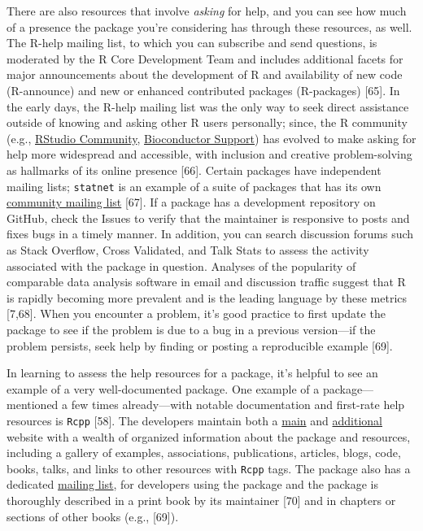 \documentclass[10pt,letterpaper]{article}
\begin{document}
There are also resources that involve \emph{asking} for help, and you
can see how much of a presence the package you're considering has
through these resources, as well. The R-help mailing list, to which you
can subscribe and send questions, is moderated by the R Core Development
Team and includes additional facets for major announcements about the
development of R and availability of new code (R-announce) and new or
enhanced contributed packages (R-packages) {[}65{]}. In the early days,
the R-help mailing list was the only way to seek direct assistance
outside of knowing and asking other R users personally; since, the R
community (e.g., \href{https://community.rstudio.com/}{RStudio
Community}, \href{https://support.bioconductor.org/}{Bioconductor
Support}) has evolved to make asking for help more widespread and
accessible, with inclusion and creative problem-solving as hallmarks of
its online presence {[}66{]}. Certain packages have independent mailing
lists; \texttt{statnet} is an example of a suite of packages that has
its own \href{http://statnet.org/}{community mailing list} {[}67{]}. If
a package has a development repository on GitHub, check the Issues to
verify that the maintainer is responsive to posts and fixes bugs in a
timely manner. In addition, you can search discussion forums such as
Stack Overflow, Cross Validated, and Talk Stats to assess the activity
associated with the package in question. Analyses of the popularity of
comparable data analysis software in email and discussion traffic
suggest that R is rapidly becoming more prevalent and is the leading
language by these metrics {[}7,68{]}. When you encounter a problem, it's
good practice to first update the package to see if the problem is due
to a bug in a previous version---if the problem persists, seek help by
finding or posting a reproducible example {[}69{]}.

In learning to assess the help resources for a package, it's helpful to
see an example of a very well-documented package. One example of a
package---mentioned a few times already---with notable documentation and
first-rate help resources is \texttt{Rcpp} {[}58{]}. The developers
maintain both a \href{http://www.rcpp.org/}{main} and
\href{http://dirk.eddelbuettel.com/code/rcpp.html}{additional} website
with a wealth of organized information about the package and resources,
including a gallery of examples, associations, publications, articles,
blogs, code, books, talks, and links to other resources with
\texttt{Rcpp} tags. The package also has a dedicated
\href{https://lists.r-forge.r-project.org/cgi-bin/mailman/listinfo/rcpp-devel}{mailing
list}, for developers using the package and the package is thoroughly
described in a print book by its maintainer {[}70{]} and in chapters or
sections of other books (e.g., {[}69{]}).
\end{document}
